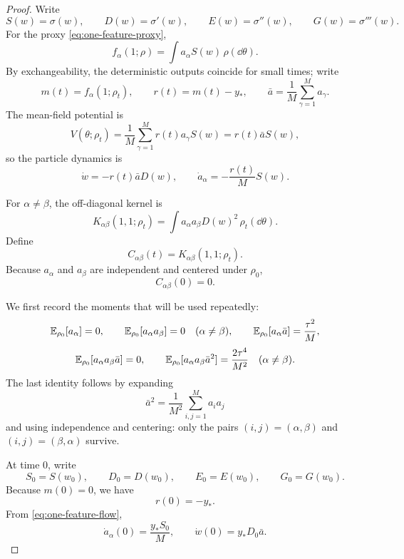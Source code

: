 \begin{proof}
Write
\[
  S(w)=\sigma(w),
  \qquad
  D(w)=\sigma'(w),
  \qquad
  E(w)=\sigma''(w),
  \qquad
  G(w)=\sigma'''(w).
\]
For the proxy \eqref{eq:one-feature-proxy},
\[
  f_\alpha(1;\rho)=\int a_\alpha S(w)\,\rho(\dd \theta).
\]
By exchangeability, the deterministic outputs coincide for small times; write
\[
  m(t)=f_\alpha(1;\rho_t),
  \qquad
  r(t)=m(t)-y_*,
  \qquad
  \bar a=\frac1M \sum_{\gamma=1}^M a_\gamma.
\]
The mean-field potential is
\[
  V(\theta;\rho_t)
  =
  \frac1M \sum_{\gamma=1}^M r(t)a_\gamma S(w)
  =
  r(t)\bar a S(w),
\]
so the particle dynamics is
\begin{equation}
  \dot w=-r(t)\bar a D(w),
  \qquad
  \dot a_\alpha=-\frac{r(t)}{M}S(w).
  \label{eq:one-feature-flow}
\end{equation}

For $\alpha\neq\beta$, the off-diagonal kernel is
\[
  K_{\alpha\beta}(1,1;\rho_t)
  =
  \int a_\alpha a_\beta D(w)^2\,\rho_t(\dd \theta).
  \label{eq:one-feature-kernel}
\]
Define
\[
  C_{\alpha\beta}(t)=K_{\alpha\beta}(1,1;\rho_t).
\]
Because $a_\alpha$ and $a_\beta$ are independent and centered under $\rho_0$,
\[
  C_{\alpha\beta}(0)=0.
  \label{eq:one-feature-zero}
\]

We first record the moments that will be used repeatedly:
\begin{equation}
  \mathbb{E}_{\rho_0}[a_\alpha]=0,
  \qquad
  \mathbb{E}_{\rho_0}[a_\alpha a_\beta]=0
  \quad (\alpha\neq\beta),
  \qquad
  \mathbb{E}_{\rho_0}[a_\alpha \bar a]=\frac{\tau^2}{M},
  \label{eq:one-feature-moments-1}
\end{equation}
\begin{equation}
  \mathbb{E}_{\rho_0}[a_\alpha a_\beta \bar a]=0,
  \qquad
  \mathbb{E}_{\rho_0}[a_\alpha a_\beta \bar a^2]=\frac{2\tau^4}{M^2}
  \quad (\alpha\neq\beta).
  \label{eq:one-feature-moments-2}
\end{equation}
The last identity follows by expanding
\[
  \bar a^2
  =
  \frac1{M^2}\sum_{i,j=1}^M a_i a_j
\]
and using independence and centering:
only the pairs $(i,j)=(\alpha,\beta)$ and $(i,j)=(\beta,\alpha)$ survive.

At time $0$, write
\[
  S_0=S(w_0),
  \qquad
  D_0=D(w_0),
  \qquad
  E_0=E(w_0),
  \qquad
  G_0=G(w_0).
\]
Because $m(0)=0$, we have
\[
  r(0)=-y_*.
\]
From \eqref{eq:one-feature-flow},
\begin{equation}
  \dot a_\alpha(0)=\frac{y_* S_0}{M},
  \qquad
  \dot w(0)=y_* D_0 \bar a.
  \label{eq:one-feature-first}
\end{equation}


\end{proof}
